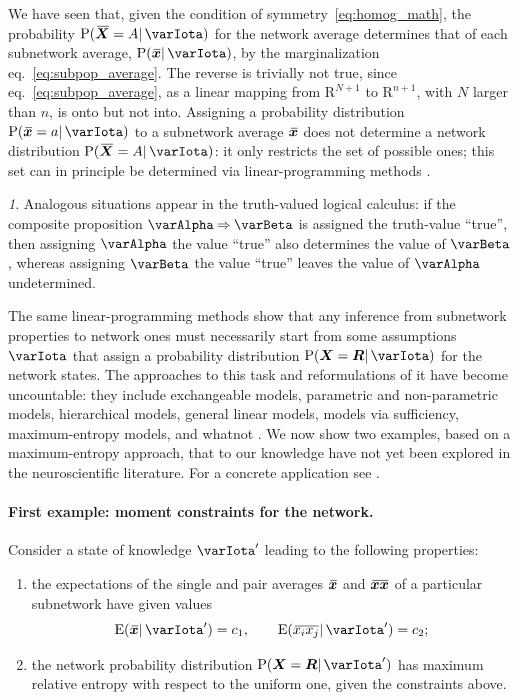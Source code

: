 \documentclass{article}
\theoremstyle{remark}
\theoremstyle{innote}
\newtheorem*{innote}{}
\newcommand*{\citep}{\parencites}
\newcommand*{\RR}{\bm{\mathrm{R}}}
\newcommand*{\limplies}{\mathbin{\Rightarrow}}%
\renewcommand*{\|}{\mathpunct{|}}%
\newcommand*{\p}{\mathrm{P}}%
\newcommand*{\eqn}{eq.}%
\newcommand*{\eg}{{e.g.}}
\newcommand*{\E}{\mathrm{E}}
\DeclarePairedDelimiter\expp{(}{)}
\newcommand*{\expe}{\E\expp}%
\theoremstyle{simple}
\newcommand*{\widebar}[1]{{\mkern1.5mu\skew{2}\overline{\mkern-1.5mu#1\mkern-1.5mu}\mkern 1.5mu}}
\newcommand*{\av}{\widebar} %
\newcommand*{\sav}{\widebar} %
\newcommand*{\yxx}{x}%
\newcommand*{\yx}{\bm{\yxx}}%
\newcommand*{\yxs}{\sav{\yx}}%
\newcommand*{\yX}{\bm{X}}%
\newcommand*{\yXf}{\av{\yX}}%
\newcommand*{\yR}{\bm{R}}%
\newcommand*{\yH}{\varIota}
\newcommand*{\yHa}{\varIota'}
\begin{document}
We have seen that, given the condition of symmetry~\eqref{eq:homog_math},
the probability $\p(\yXf = A \|\yH)$ for the network average determines
that of each subnetwork average, $\p(\yxs \|\yH)$, by the
marginalization \eqn~\eqref{eq:subpop_average}. The reverse is trivially
not true, since \eqn~\eqref{eq:subpop_average}, as a linear mapping from
$\RR^{N+1}$ to $\RR^{n+1}$, with $N$ larger than $n$, is onto but not into.
Assigning a probability distribution $\p(\yxs = a \|\yH)$ to a
subnetwork average $\yxs$ does not determine a network distribution
$\p(\yXf = A\|\yH)$: it only restricts the set of possible ones; this
set can in principle be determined via linear-programming methods
\citep{hailperin1965,hailperin1984,hailperin1996,hailperin2006,hailperin2011}.
\begin{innote}
  Analogous situations appear in the truth-valued logical calculus: if the
  composite proposition $\varAlpha\limplies \varBeta$ is assigned the
  truth-value \enquote{true}, then assigning $\varAlpha$ the value
  \enquote{true} also determines the value of $\varBeta$, whereas assigning
  $\varBeta$ the value \enquote{true} leaves the value of $\varAlpha$
  undetermined.
\end{innote}
The same linear-programming methods show that any inference from subnetwork
properties to network ones must necessarily start from some assumptions
$\varIota$ that assign a probability distribution
$\p(\yX = \yR \| \varIota)$ for the network states. The approaches to
this task and reformulations of it have become uncountable: they include
exchangeable models, parametric and non-parametric models, hierarchical
models, general linear models, models via sufficiency, maximum-entropy
models, and whatnot
\citep[\eg:][]{jeffreys1931_r1973,jeffreys1939_r2003,jaynes1994_r2003,bernardoetal1994,gelmanetal1995_r2014,ghoshetal1997,kallenberg2005,gregory2005,sivia1996_r2006,ferreiraetal2007,dawid2013,damienetal2013}.
We now show two examples, based on a maximum-entropy approach, that to our
knowledge have not yet been explored in the neuroscientific literature. For
a concrete application see \citep{rostamietal2016b}.



\paragraph{First example: moment constraints for the network.}
\label{sec:maxent_moments}
Consider a state of knowledge $\yHa$ leading to the following properties:
\begin{enumerate}%
\item the expectations of the single and pair averages $\yxs$ and
  $\sav{\yx\yx}$ of a particular subnetwork have given values
  \begin{equation}
    \label{eq:constr_ex1}
    \expe{\yxs \| \yHa} = c_1, \qquad \expe{\sav{x_i x_j}\|\yHa} = c_2;
  \end{equation}
\item the network probability distribution $\p(\yX = \yR \|\yHa)$
  has maximum relative entropy with respect to the uniform one, given the
  constraints above.
\end{enumerate}
\end{document}
